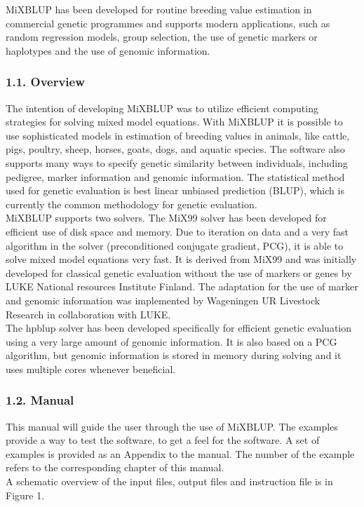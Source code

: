 MiXBLUP has been developed for routine breeding value estimation in
commercial genetic programmes and supports modern applications, such as
random regression models, group selection, the use of genetic markers or
haplotypes and the use of genomic information.

\subsubsection{1.1. Overview}\label{Intr02}

The intention of developing MiXBLUP was to utilize efficient computing
strategies for solving mixed model equations. With MiXBLUP it is
possible to use sophisticated models in estimation of breeding values in
animals, like cattle, pigs, poultry, sheep, horses, goats, dogs, and
aquatic species. The software also supports many ways to specify genetic
similarity between individuals, including pedigree, marker information
and genomic information. The statistical method used for genetic
evaluation is best linear unbiased prediction (BLUP), which is currently
the common methodology for genetic evaluation.\\
MiXBLUP supports two solvers. The MiX99 solver has been developed for
efficient use of disk space and memory. Due to iteration on data and a
very fast algorithm in the solver (preconditioned conjugate gradient,
PCG), it is able to solve mixed model equations very fast. It is derived
from MiX99 and was initially developed for classical genetic evaluation
without the use of markers or genes by LUKE National resources Institute
Finland. The adaptation for the use of marker and genomic information
was implemented by Wageningen UR Livestock Research in collaboration
with LUKE.\\
The hpblup solver has been developed specifically for efficient genetic
evaluation using a very large amount of genomic information. It is also
based on a PCG algorithm, but genomic information is stored in memory
during solving and it uses multiple cores whenever beneficial.

\subsubsection{1.2. Manual}\label{Intr03}

This manual will guide the user through the use of MiXBLUP. The examples
provide a way to test the software, to get a feel for the software. A
set of examples is provided as an Appendix to the manual. The number of
the example refers to the corresponding chapter of this manual.\\
A schematic overview of the input files, output files and instruction
file is in Figure 1.\\


